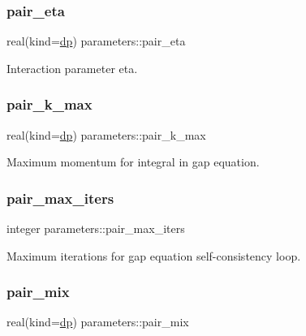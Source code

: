 \subsubsection{\texorpdfstring{pair\+\_\+eta}{pair\_eta}}
{\footnotesize\ttfamily real(kind=\mbox{\hyperlink{namespaceparameters_a52f8c6351fd79345d8811e065bcbbb37}{dp}}) parameters\+::pair\+\_\+eta}



Interaction parameter eta. 

\mbox{\label{group__INPUT__PARS_ga0d7d7715270e262c6f4e02633947b548}} 
\subsubsection{\texorpdfstring{pair\+\_\+k\+\_\+max}{pair\_k\_max}}
{\footnotesize\ttfamily real(kind=\mbox{\hyperlink{namespaceparameters_a52f8c6351fd79345d8811e065bcbbb37}{dp}}) parameters\+::pair\+\_\+k\+\_\+max}



Maximum momentum for integral in gap equation. 

\mbox{\label{group__INPUT__PARS_gafef003bd348d08faadb13f56378b8e4c}} 
\subsubsection{\texorpdfstring{pair\+\_\+max\+\_\+iters}{pair\_max\_iters}}
{\footnotesize\ttfamily integer parameters\+::pair\+\_\+max\+\_\+iters}



Maximum iterations for gap equation self-\/consistency loop. 

\mbox{\label{group__INPUT__PARS_ga6fdafa171f65aa7236a9c76ebaab4d08}} 
\subsubsection{\texorpdfstring{pair\+\_\+mix}{pair\_mix}}
{\footnotesize\ttfamily real(kind=\mbox{\hyperlink{namespaceparameters_a52f8c6351fd79345d8811e065bcbbb37}{dp}}) parameters\+::pair\+\_\+mix}



